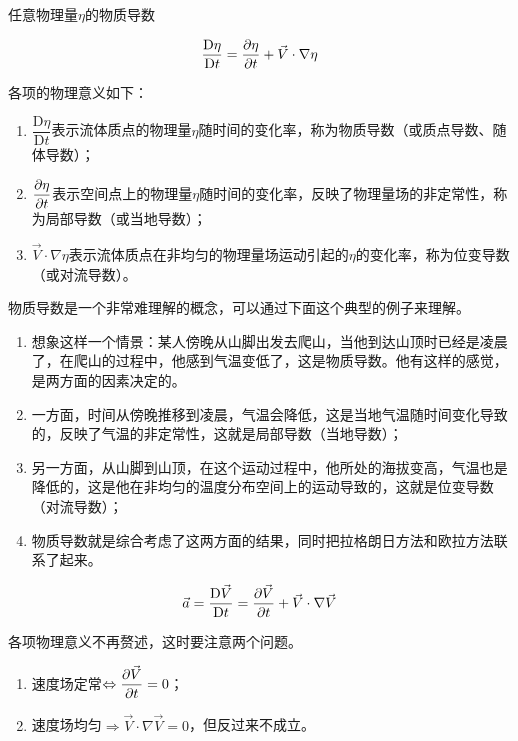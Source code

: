 任意物理量$\eta$的物质导数

\begin{equation}
	\dfrac{\mathrm{D}\eta}{\mathrm{D}t} = \pdv{\eta}{t} + \vec{V} \cdot \nabla \eta 
\end{equation}

各项的物理意义如下：

\begin{enumerate}
	\item $\dfrac{\mathrm{D}\eta}{\mathrm{D}t}$表示流体质点的物理量$\eta$随时间的变化率，称为物质导数（或质点导数、随体导数）；
	\vskip 0.1cm
	\item $\displaystyle \pdv{\eta}{t}$表示空间点上的物理量$\eta$随时间的变化率，反映了物理量场的非定常性，称为局部导数（或当地导数）；
	\item $\vec{V} \cdot \nabla \eta$表示流体质点在非均匀的物理量场运动引起的$\eta$的变化率，称为位变导数（或对流导数）。
\end{enumerate}

\begin{tip}
	物质导数是一个非常难理解的概念，可以通过下面这个典型的例子来理解。
	\begin{enumerate}
		\item 想象这样一个情景：某人傍晚从山脚出发去爬山，当他到达山顶时已经是凌晨了，在爬山的过程中，他感到气温变低了，这是物质导数。他有这样的感觉，是两方面的因素决定的。
		\item 一方面，时间从傍晚推移到凌晨，气温会降低，这是当地气温随时间变化导致的，反映了气温的非定常性，这就是局部导数（当地导数）；
		\item 另一方面，从山脚到山顶，在这个运动过程中，他所处的海拔变高，气温也是降低的，这是他在非均匀的温度分布空间上的运动导致的，这就是位变导数（对流导数）；
		\item 物质导数就是综合考虑了这两方面的结果，同时把拉格朗日方法和欧拉方法联系了起来。
	\end{enumerate}
\end{tip}


\begin{equation}
	\vec{a} = \dfrac{\mathrm{D}\vec{V}}{\mathrm{D}t} = \pdv{\vec{V}}{t} + \vec{V} \cdot \nabla \vec{V}
\end{equation}

各项物理意义不再赘述，这时要注意两个问题。

\begin{enumerate}
	\item 速度场定常$\Leftrightarrow \displaystyle \pdv{\vec{V}}{t} = 0$；
	\vskip 0.1cm
	\item 速度场均匀$\Rightarrow \vec{V} \cdot \nabla \vec{V} = 0$，但反过来不成立。
\end{enumerate}

